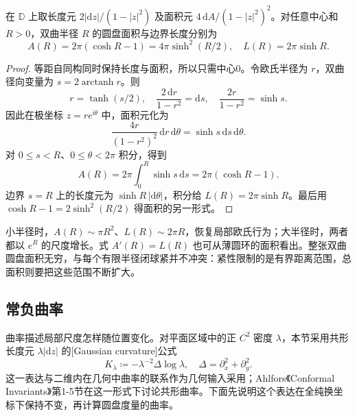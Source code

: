 \begin{proposition}[双曲圆的长度与面积]\label{b3:prop:13-ball-area}
在 \(\mathbb D\) 上取长度元 \(2|\mathrm dz|/(1-|z|^2)\) 及面积元 \(4\,\mathrm dA/(1-|z|^2)^2\)。对任意中心和 \(R>0\)，双曲半径 \(R\) 的圆盘面积与边界长度分别为
\[
 A(R)=2\pi(\cosh R-1)=4\pi\sinh^2(R/2),\quad
 L(R)=2\pi\sinh R.
\]
\end{proposition}
\begin{proof}
等距自同构同时保持长度与面积，所以只需中心0。令欧氏半径为 \(r\)，双曲径向变量为 \(s=2\operatorname{arctanh}r\)。则
\[
 r=\tanh(s/2),\quad
 \frac{2\,\mathrm dr}{1-r^2}=\mathrm ds,\quad
 \frac{2r}{1-r^2}=\sinh s.
\]
因此在极坐标 \(z=re^{\mathrm i\theta}\) 中，面积元化为
\[
 \frac{4r}{(1-r^2)^2}\,\mathrm dr\,\mathrm d\theta
 =\sinh s\,\mathrm ds\,\mathrm d\theta.
\]
对 \(0\le s<R\)、\(0\le\theta<2\pi\) 积分，得到
\[
 A(R)=2\pi\int_0^R\sinh s\,\mathrm ds
 =2\pi(\cosh R-1).
\]
边界 \(s=R\) 上的长度元为 \(\sinh R\,|\mathrm d\theta|\)，积分给 \(L(R)=2\pi\sinh R\)。最后用 \(\cosh R-1=2\sinh^2(R/2)\) 得面积的另一形式。
\end{proof}

小半径时，\(A(R)\sim\pi R^2\)、\(L(R)\sim2\pi R\)，恢复局部欧氏行为；大半径时，两者都以 \(e^R\) 的尺度增长。式 \(A'(R)=L(R)\) 也可从薄圆环的面积看出。整张双曲圆盘面积无穷，与每个有限半径闭球紧并不冲突：紧性限制的是有界距离范围，总面积则要把这些范围不断扩大。

\subsection{常负曲率}
\label{b3:subsec:130203}

曲率描述局部尺度怎样随位置变化。对平面区域中的正 \(C^2\) 密度 \(\lambda\)，本节采用共形长度元 \(\lambda|\mathrm dz|\) 的[Gaussian curvature]公式
\[
 K_\lambda\coloneqq-\lambda^{-2}\Delta\log\lambda,\quad
 \Delta=\partial_x^2+\partial_y^2.
\]
这一表达与二维内在几何中曲率的联系作为几何输入采用；Ahlfors《Conformal Invariants》第1-5节在这一形式下讨论共形曲率\cite[1-5 Ultrahyperbolic Metrics, p.~12]{Ahlfors2010Conformal}。下面先说明这个表达在全纯换坐标下保持不变，再计算圆盘度量的曲率。

